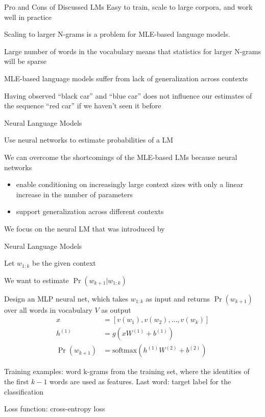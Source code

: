 \documentclass[12pt]{beamer}
\begin{document}
\begin{frame}{Pro and Cons of Discussed LMs}
Easy to train, scale to large corpora, and work well in practice

Scaling to larger N-grams is a problem for MLE-based language models. 

Large number of words in the vocabulary means that statistics for larger N-grams will be sparse

MLE-based language models suffer from lack of generalization across contexts

Having observed ``black car'' and ``blue car'' does not influence our estimates of the sequence ``red car'' if we haven’t seen it before

\end{frame}
\begin{frame}{Neural Language Models}

Use neural networks to estimate probabilities of a LM

We can overcome the shortcomings of the MLE-based LMs because neural networks 
		\begin{itemize}
			\item enable conditioning on increasingly large context sizes with only a linear increase in the number of parameters
			\item support generalization across different contexts
		\end{itemize}

We focus on the neural LM that was introduced by \citep{Bengio.et.al.2003.JMLR}

\end{frame}
\begin{frame}{Neural Language Models}

Let $w_{1:k}$ be the given context

We want to estimate $\Pr(w_{k+1}|w_{1:k})$

Design an MLP neural net, which takes $w_{1:k}$ as input and returns $\Pr(w_{k+1})$ over all words in vocabulary $V$ as output
$$
\begin{aligned}		
x  &= [v(w_1), v(w_2), ..., v(w_k)] \\
h^{(1)} &= g(xW^{(1)}+b^{(1)}) \\
\Pr(w_{k+1}) &= \text{softmax}(h^{(1)}W^{(2)}+b^{(2)})
\end{aligned}
$$

Training examples: word k-grams from the training set, where the identities of the first $k-1$ words are used as features. Last word: target label for the classification

Loss function: cross-entropy loss

\end{frame}
\end{document}
